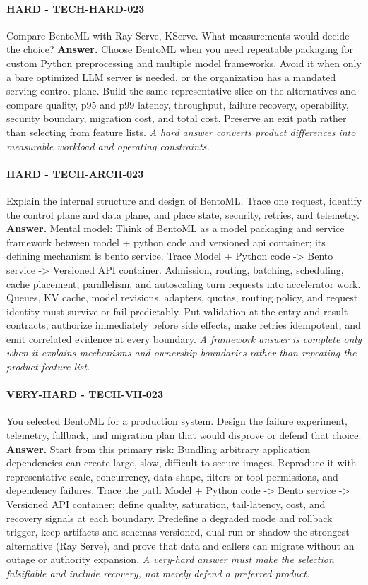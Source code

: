 \paragraph{HARD - TECH-HARD-023} Compare BentoML with Ray Serve, KServe. What measurements would decide the choice?
\textbf{Answer.} Choose BentoML when you need repeatable packaging for custom Python preprocessing and multiple model frameworks. Avoid it when only a bare optimized LLM server is needed, or the organization has a mandated serving control plane. Build the same representative slice on the alternatives and compare quality, p95 and p99 latency, throughput, failure recovery, operability, security boundary, migration cost, and total cost. Preserve an exit path rather than selecting from feature lists.
\textit{A hard answer converts product differences into measurable workload and operating constraints.}
\paragraph{HARD - TECH-ARCH-023} Explain the internal structure and design of BentoML. Trace one request, identify the control plane and data plane, and place state, security, retries, and telemetry.
\textbf{Answer.} Mental model: Think of BentoML as a model packaging and service framework between model + python code and versioned api container; its defining mechanism is bento service. Trace Model + Python code -> Bento service -> Versioned API container. Admission, routing, batching, scheduling, cache placement, parallelism, and autoscaling turn requests into accelerator work. Queues, KV cache, model revisions, adapters, quotas, routing policy, and request identity must survive or fail predictably. Put validation at the entry and result contracts, authorize immediately before side effects, make retries idempotent, and emit correlated evidence at every boundary.
\textit{A framework answer is complete only when it explains mechanisms and ownership boundaries rather than repeating the product feature list.}
\paragraph{VERY-HARD - TECH-VH-023} You selected BentoML for a production system. Design the failure experiment, telemetry, fallback, and migration plan that would disprove or defend that choice.
\textbf{Answer.} Start from this primary risk: Bundling arbitrary application dependencies can create large, slow, difficult-to-secure images. Reproduce it with representative scale, concurrency, data shape, filters or tool permissions, and dependency failures. Trace the path Model + Python code -> Bento service -> Versioned API container; define quality, saturation, tail-latency, cost, and recovery signals at each boundary. Predefine a degraded mode and rollback trigger, keep artifacts and schemas versioned, dual-run or shadow the strongest alternative (Ray Serve), and prove that data and callers can migrate without an outage or authority expansion.
\textit{A very-hard answer must make the selection falsifiable and include recovery, not merely defend a preferred product.}
